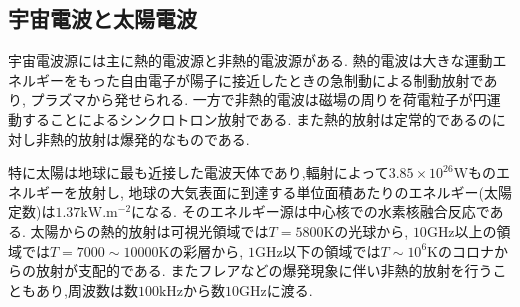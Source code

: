 \subsection{宇宙電波と太陽電波}
宇宙電波源には主に熱的電波源と非熱的電波源がある.
熱的電波は大きな運動エネルギーをもった自由電子が陽子に接近したときの急制動による制動放射であり,
プラズマから発せられる.
一方で非熱的電波は磁場の周りを荷電粒子が円運動することによるシンクロトロン放射である.
また熱的放射は定常的であるのに対し非熱的放射は爆発的なものである.

特に太陽は地球に最も近接した電波天体であり,輻射によって$3.85\times10^{26}\si{\watt}$ものエネルギーを放射し,
地球の大気表面に到達する単位面積あたりのエネルギー(太陽定数)は$1.37\si{\kilo\watt.\metre^{-2}}$になる.\cite{rikanenpyo}
そのエネルギー源は中心核での水素核融合反応である.
太陽からの熱的放射は可視光領域では$T=5800\si{\kelvin}$の光球から,
$10\si{\giga\hertz}$以上の領域では$T=7000\sim10000\si{\kelvin}$の彩層から,
$1\si{\giga\hertz}$以下の領域では$T\sim10^6\si{\kelvin}$のコロナからの放射が支配的である.
またフレアなどの爆発現象に伴い非熱的放射を行うこともあり,周波数は数$100\si{\kilo\hertz}$から数$10\si{\giga\hertz}$に渡る.